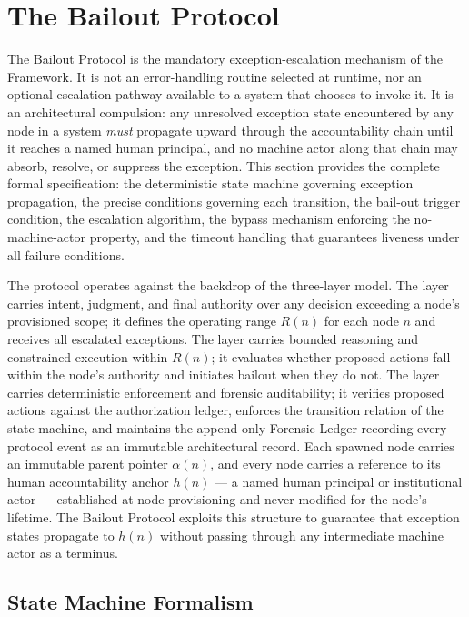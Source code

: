 \section{The Bailout Protocol}\label{sec:bailout}

The Bailout Protocol is the mandatory exception-escalation mechanism of the \bxthree{} Framework. It is not an error-handling routine selected at runtime, nor an optional escalation pathway available to a system that chooses to invoke it. It is an architectural compulsion: any unresolved exception state encountered by any node in a \bxthree{} system \emph{must} propagate upward through the accountability chain until it reaches a named human principal, and no machine actor along that chain may absorb, resolve, or suppress the exception. This section provides the complete formal specification: the deterministic state machine governing exception propagation, the precise conditions governing each transition, the bail-out trigger condition, the escalation algorithm, the bypass mechanism enforcing the no-machine-actor property, and the timeout handling that guarantees liveness under all failure conditions.

The protocol operates against the backdrop of the \bxthree{} three-layer model. The \purpose{} layer carries intent, judgment, and final authority over any decision exceeding a node's provisioned scope; it defines the operating range $R(n)$ for each node $n$ and receives all escalated exceptions. The \bounds{} layer carries bounded reasoning and constrained execution within $R(n)$; it evaluates whether proposed actions fall within the node's authority and initiates bailout when they do not. The \fact{} layer carries deterministic enforcement and forensic auditability; it verifies proposed actions against the authorization ledger, enforces the transition relation of the state machine, and maintains the append-only Forensic Ledger recording every protocol event as an immutable architectural record. Each spawned node carries an immutable parent pointer $\alpha(n)$, and every node carries a reference to its human accountability anchor $h(n)$ — a named human principal or institutional actor — established at node provisioning and never modified for the node's lifetime. The Bailout Protocol exploits this structure to guarantee that exception states propagate to $h(n)$ without passing through any intermediate machine actor as a terminus.

\subsection{State Machine Formalism}\label{sec:state-machine}

